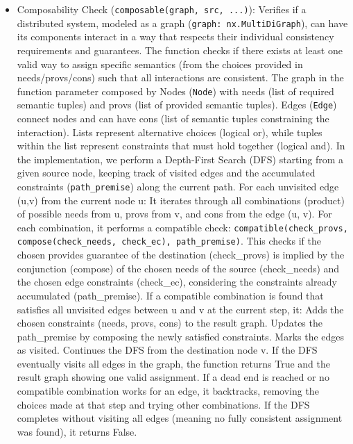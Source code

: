 \begin{itemize}
  \item Composability Check (\texttt{composable(graph, src,
    ...)}): Verifies if a distributed
    system, modeled as a graph (\texttt{graph: nx.MultiDiGraph}),
    can have its components
    interact in a way that respects their individual consistency
    requirements and
    guarantees. The function checks if there exists at least one
    valid way to assign
    specific semantics (from the choices provided in
    needs/provs/cons) such that all
    interactions are consistent. The graph in the function
    parameter composed by
    Nodes (\texttt{Node}) with needs (list of required semantic
    tuples) and provs (list of
    provided semantic tuples). Edges (\texttt{Edge}) connect
    nodes and can have cons (list
    of semantic tuples constraining the interaction). Lists
    represent alternative
    choices (logical or), while tuples within the list represent
    constraints that
    must hold together (logical and). In the implementation, we perform a
    Depth-First Search (DFS) starting from a given source node,
    keeping track of
    visited edges and the accumulated constraints
    (\texttt{path\_premise}) along the current
    path. For each unvisited edge (u,v) from the current node u:
    It iterates through
    all combinations (product) of possible needs from u, provs
    from v, and cons from
    the edge (u, v). For each combination, it performs a
    compatible check: \texttt{compatible(check\_provs,
    compose(check\_needs, check\_ec), path\_premise)}.
    This checks if the chosen provides guarantee of the
    destination (check\_provs) is
    implied by the conjunction (compose) of the chosen needs of the source
    (check\_needs) and the chosen edge constraints (check\_ec),
    considering the
    constraints already accumulated (path\_premise). If a
    compatible combination is
    found that satisfies all unvisited edges between u and v at
    the current step,
    it: Adds the chosen constraints (needs, provs, cons) to the
    result graph.
    Updates the path\_premise by composing the newly satisfied
    constraints. Marks the
    edges as visited. Continues the DFS from the destination node
    v. If the DFS
    eventually visits all edges in the graph, the function
    returns True and the
    result graph showing one valid assignment. If a dead end is
    reached or no
    compatible combination works for an edge, it backtracks,
    removing the choices
    made at that step and trying other combinations. If the DFS
    completes without
    visiting all edges (meaning no fully consistent assignment
    was found), it
    returns False.


\end{itemize}
